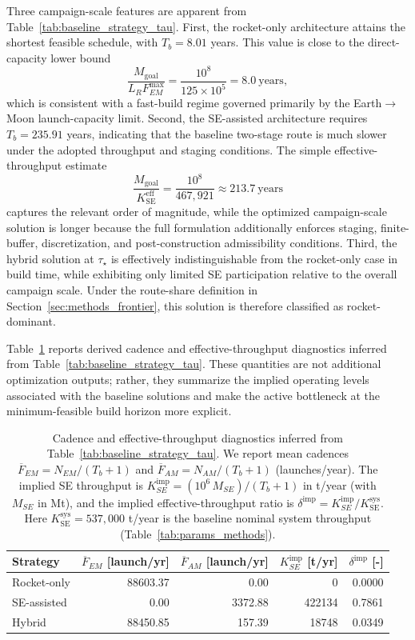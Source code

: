 \documentclass[12pt]{article}
\begin{document}
Three campaign-scale features are apparent from Table~\ref{tab:baseline_strategy_tau}. First, the rocket-only architecture attains the shortest feasible schedule, with $T_b=8.01$ years. This value is close to the direct-capacity lower bound
\[
\frac{M_{\mathrm{goal}}}{L_R F_{EM}^{\max}}
=
\frac{10^8}{125\times 10^5}
=8.0\ \text{years},
\]
which is consistent with a fast-build regime governed primarily by the Earth$\to$Moon launch-capacity limit. Second, the SE-assisted architecture requires $T_b=235.91$ years, indicating that the baseline two-stage route is much slower under the adopted throughput and staging conditions. The simple effective-throughput estimate
\[
\frac{M_{\mathrm{goal}}}{K_{\mathrm{SE}}^{\mathrm{eff}}}
=
\frac{10^8}{467{,}921}
\approx 213.7\ \text{years}
\]
captures the relevant order of magnitude, while the optimized campaign-scale solution is longer because the full formulation additionally enforces staging, finite-buffer, discretization, and post-construction admissibility conditions. Third, the hybrid solution at $\tau_\star$ is effectively indistinguishable from the rocket-only case in build time, while exhibiting only limited SE participation relative to the overall campaign scale. Under the route-share definition in Section~\ref{sec:methods_frontier}, this solution is therefore classified as rocket-dominant.

Table~\ref{tab:baseline_diag_tau} reports derived cadence and effective-throughput diagnostics inferred from Table~\ref{tab:baseline_strategy_tau}. These quantities are not additional optimization outputs; rather, they summarize the implied operating levels associated with the baseline solutions and make the active bottleneck at the minimum-feasible build horizon more explicit.

\begin{table}[htbp]
	\centering
	\caption{Cadence and effective-throughput diagnostics inferred from Table~\ref{tab:baseline_strategy_tau}.
		We report mean cadences $\overline{F}_{EM}=N_{EM}/(T_b+1)$ and $\overline{F}_{AM}=N_{AM}/(T_b+1)$ (launches/year).
		The implied SE throughput is $K_{SE}^{\mathrm{imp}}=(10^6\,M_{SE})/(T_b+1)$ in t/year (with $M_{SE}$ in Mt),
		and the implied effective-throughput ratio is $\delta^{\mathrm{imp}}=K_{SE}^{\mathrm{imp}}/K_{\mathrm{SE}}^{\mathrm{sys}}$.
		Here $K_{\mathrm{SE}}^{\mathrm{sys}}=537{,}000$ t/year is the baseline nominal system throughput
		(Table~\ref{tab:params_methods}).}
	\label{tab:baseline_diag_tau}
	
	\small
	\setlength{\tabcolsep}{4pt}
	\renewcommand{\arraystretch}{1.08}
	
	\begin{tabular}{lrrrr}
		\hline
		Strategy & $\overline{F}_{EM}$ [launch/yr] & $\overline{F}_{AM}$ [launch/yr] & $K_{SE}^{\mathrm{imp}}$ [t/yr] & $\delta^{\mathrm{imp}}$ [-] \\
		\hline
		Rocket-only & 88603.37 & 0.00    & 0        & 0.0000 \\
		SE-assisted & 0.00     & 3372.88 & 422134   & 0.7861 \\
		Hybrid      & 88450.85 & 157.39  & 18748    & 0.0349 \\
		\hline
	\end{tabular}
\end{table}
\end{document}
